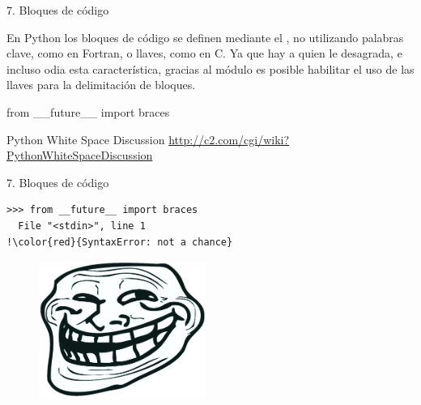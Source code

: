 \documentclass[14pt]{beamer}
\begin{document}
\begin{frame}{7. Bloques de código}
  \small
  \begin{center}
    En Python los bloques de código se definen mediante el
    , no utilizando palabras clave, como en
    Fortran, o llaves, como en C. Ya que hay a quien le desagrada, e
    incluso odia esta característica, gracias al módulo
     es posible habilitar el uso de las
    llaves para la delimitación de bloques.
  \end{center}

  \Large
  \begin{alertblock}{}
    \centering
    from \_\_future\_\_ import braces
  \end{alertblock}

  \vspace{0.5cm}

  \small
  \begin{block}{\centering Python White Space Discussion}
    \centering
    \url{http://c2.com/cgi/wiki?PythonWhiteSpaceDiscussion}
  \end{block}
\end{frame}

\begin{frame}[fragile]{7. Bloques de código}
  \begin{exampleblock}{}
    \small
    \begin{lstlisting}[escapechar=!]
>>> from __future__ import braces
  File "<stdin>", line 1
!\color{red}{SyntaxError: not a chance}
    \end{lstlisting}
  \end{exampleblock}

  \begin{figure}
    \centering
    \includegraphics[height=4.5cm]{pics/trollface.png}
  \end{figure}
\end{frame}
\end{document}
